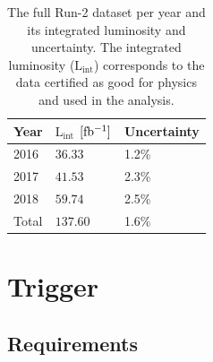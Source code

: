 \begin{table}[htb]
\centering
\caption[The full Run-2 dataset per year and its integrated luminosity and uncertainty]{\label{tab:datasamples} The full Run-2 dataset per year and its integrated luminosity and uncertainty. The integrated luminosity ($\mathrm{L_{int}}$) corresponds to the data certified as good for physics and used in the analysis.}
\begin{tabularx}{\textwidth}{XXX}
\hline
    Year & $\mathrm{L_{int}}$ $[\mathrm{ fb^{-1} }]$ & Uncertainty    \\
    \hline
    2016 &  $36.33$                         &  1.2\%         \\
    2017 &  $41.53$                         &  2.3\%         \\
    2018 &  $59.74$                         &  2.5\%         \\
    Total & $137.60$                        &  1.6\%         \\
\hline
\end{tabularx}
\end{table}

\section{Trigger} \label{sec:trigger}
\subsection{Requirements}

